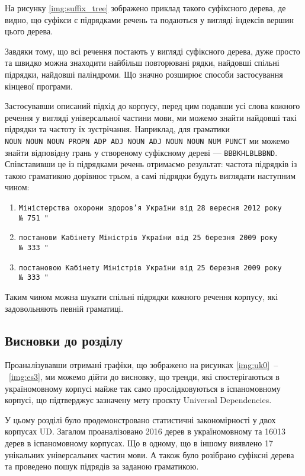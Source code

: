 На рисунку \ref{img:suffix_tree} зображено приклад такого суфіксного дерева,
де видно, що суфікси є підрядками речень та подаються у вигляді індексів
вершин цього дерева.

Завдяки тому, що всі речення постають у вигляді суфіксного дерева, дуже просто
та швидко можна знаходити найбільш повторювані рядки, найдовші спільні
підрядки, найдовші паліндроми. Що значно розширює способи застосування
кінцевої програми.

Застосувавши описаний підхід до корпусу, перед цим подавши усі слова кожного
речення у вигляді універсальної частини мови, ми можемо знайти найдовші такі
підрядки та частоту їх зустрічання. Наприклад, для граматики
\texttt{NOUN~NOUN~NOUN~PROPN~ADP~ADJ~NOUN~ADJ~NOUN~NOUN~NUM~PUNCT} ми можемо
знайти відповідну грань у створеному суфіксному дереві --- \texttt{BBBKHLBLBBND}.
Співставивши це із підрядками речень отримаємо результат: частота підрядків
із такою граматикою дорівнює трьом, а самі підрядки будуть виглядати наступним
чином: 
\begin{enumerate}
    \item \texttt{Міністерства охорони здоров’я України від 28 вересня 2012 року
    №~751~"}
    \item \texttt{постанови Кабінету Міністрів України від 25 березня 2009 року
    №~333~"}
    \item \texttt{постановою Кабінету Міністрів України від 25 березня 2009 року 
    №~333~"}
\end{enumerate}

Таким чином можна шукати спільні підрядки кожного речення корпусу, які
задовольняють певній граматиці. 


\subsection*{Висновки до розділу }
Проаналізувавши отримані графіки, що зображено на рисунках
\ref{img:uk0}~\nobreakdash--~\ref{img:es3},
ми можемо дійти до висновку, що тренди, які
спостерігаються в україномовному корпусі майже так само прослідковуються в
іспаномовному корпусі, що підтверджує зазначену мету проєкту Universal Dependencies.

У цьому розділі було продемонстровано статистичні закономірності у двох
корпусах UD. Загалом проаналізовано 2016 дерев в україномовному та 16013 дерев
в іспаномовному корпусах. Що в одному, що в іншому виявлено 17 унікальних
універсальних частин мови. А також було розібрано суфіксні дерева та проведено
пошук підрядів за заданою граматикою.
